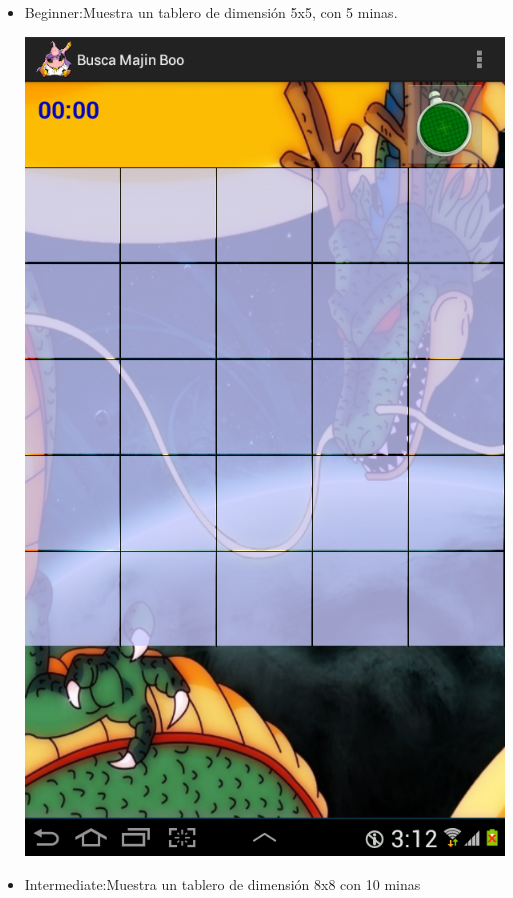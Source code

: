 \documentclass[11pt]{article} %
\begin{document}
\begin{itemize}
\item Beginner:Muestra un tablero de dimensión 5x5, con 5 minas.\\
\begin{center}
\includegraphics[scale=0.2]{Imagenes/SSEasy.png}
\end{center}
\item Intermediate:Muestra un tablero de dimensión 8x8 con 10 minas\\
\begin{center}

\end{center}
\end{itemize}
\end{document}

